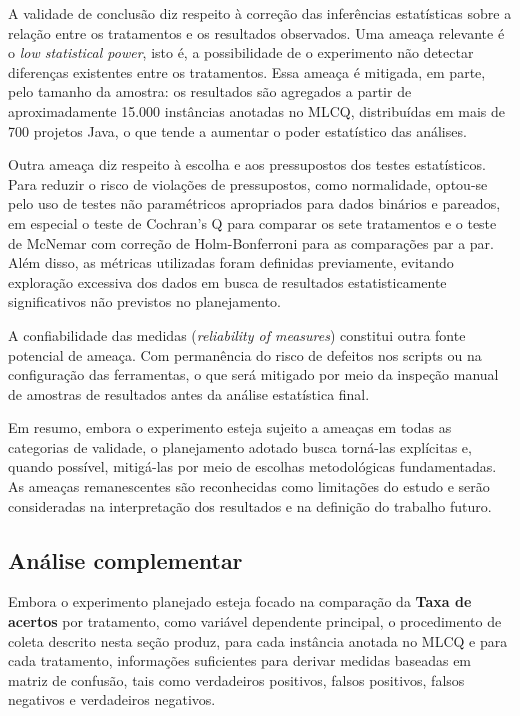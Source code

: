 A validade de conclusão diz respeito à correção das inferências estatísticas sobre a relação entre os tratamentos e os resultados observados. 
Uma ameaça relevante é o \textit{low statistical power}, isto é, a possibilidade de o experimento não detectar diferenças existentes entre os tratamentos. 
Essa ameaça é mitigada, em parte, pelo tamanho da amostra: os resultados são agregados a partir de aproximadamente 15.000 instâncias anotadas no MLCQ, 
distribuídas em mais de 700 projetos Java, o que tende a aumentar o poder estatístico das análises.

Outra ameaça diz respeito à escolha e aos pressupostos dos testes estatísticos. Para reduzir o risco de violações de pressupostos, como normalidade, 
optou-se pelo uso de testes não paramétricos apropriados para dados binários e pareados, em especial o teste de Cochran's Q para comparar os sete 
tratamentos e o teste de McNemar com correção de Holm-Bonferroni para as comparações par a par. Além disso, as métricas utilizadas foram definidas 
previamente, evitando exploração excessiva dos dados em busca de resultados estatisticamente significativos não previstos no planejamento.

A confiabilidade das medidas (\textit{reliability of measures}) constitui outra fonte potencial de ameaça. Com permanência do risco de defeitos nos scripts ou 
na configuração das ferramentas, o que será mitigado por meio da inspeção manual de amostras de resultados antes da análise estatística final.

Em resumo, embora o experimento esteja sujeito a ameaças em todas as categorias de validade, o planejamento adotado busca torná-las explícitas e, quando 
possível, mitigá-las por meio de escolhas metodológicas fundamentadas. As ameaças remanescentes são reconhecidas como limitações do estudo e serão consideradas 
na interpretação dos resultados e na definição do trabalho futuro.

\subsection{Análise complementar}
\label{sec:analise-complementar}

Embora o experimento planejado esteja focado na comparação da \textbf{Taxa de acertos } por tratamento, 
como variável dependente principal, o procedimento de coleta descrito nesta seção produz, para cada instância anotada no MLCQ e para 
cada tratamento, informações suficientes para derivar medidas baseadas em matriz de confusão, tais como verdadeiros positivos, falsos positivos, 
falsos negativos e verdadeiros negativos.

